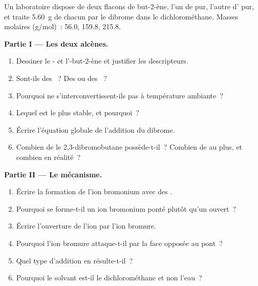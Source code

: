 \begin{problem}
\label{pb:b1:electrophilic-additions:1}
Un laboratoire dispose de deux flacons de but-2-ène, l'un de  pur,
l'autre d' pur, et traite \qty{5.60}{g} de chacun par le dibrome
dans le dichlorométhane. Masses molaires (\unit{g/mol})~:  56.0, 
159.8,  215.8.

\medskip
\noindent\textbf{Partie I --- Les deux alcènes.}
\begin{enumerate}
  \item Dessiner le - et l'-but-2-ène et justifier les
        descripteurs.
  \item Sont-ils des ~? Des  ou des
        ~?
  \item Pourquoi ne s'interconvertissent-ils pas à température ambiante~?
  \item Lequel est le plus stable, et pourquoi~?
  \item Écrire l'équation globale de l'addition du dibrome.
  \item Combien de  le 2,3-dibromobutane
        possède-t-il~? Combien de  au plus, et combien en
        réalité~?
\end{enumerate}

\medskip
\noindent\textbf{Partie II --- Le mécanisme.}
\begin{enumerate}[resume]
  \item Écrire la formation de l'ion bromonium avec des .
  \item Pourquoi se forme-t-il un ion bromonium ponté plutôt qu'un
         ouvert~?
  \item Écrire l'ouverture de l'ion par l'ion bromure.
  \item Pourquoi l'ion bromure attaque-t-il par la face opposée au pont~?
  \item Quel type d'addition en résulte-t-il~?
  \item Pourquoi le solvant est-il le dichlorométhane et non l'eau~?
\end{enumerate}


\end{problem}
